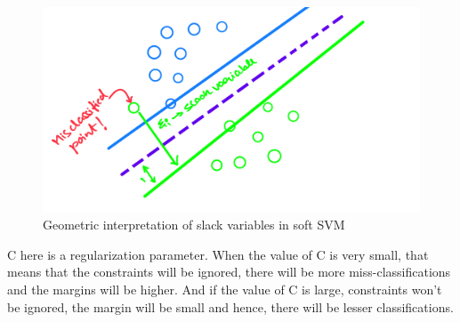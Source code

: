 \documentclass[11pt]{article}
\begin{document}
\begin{figure}[H]
\begin{center}
\includegraphics[scale=0.28]{figures/SlackSVM.PNG}
\end{center}
\caption{Geometric interpretation of slack variables in soft SVM}
\label{fig:Slackvariables}
\end{figure}

C here is a regularization parameter. When the value of C is very small, that means that the constraints will be ignored, there will be more miss-classifications and the margins will be higher. And if the value of C is large, constraints won't be ignored, the margin will be small and hence, there will be lesser classifications.
\end{document}
